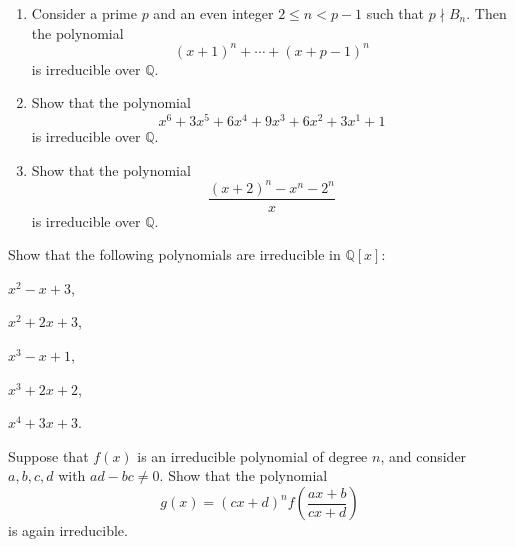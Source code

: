 \begin{example}
  \begin{enumerate}
  \item Consider a prime $p$ and an even integer $2\leq n<p-1$ such that $p\nmid B_n$. Then the polynomial
    \begin{equation*}
      (x+1)^n+\cdots+(x+p-1)^n
    \end{equation*}
    is irreducible over $\mathbb{Q}$.
  \item Show that the polynomial
    \begin{equation*}
      x^6+3x^5+6x^4+9x^3+6x^2+3x^1+1
    \end{equation*}
    is irreducible over $\mathbb{Q}$.
  \item Show that the polynomial
    \begin{equation*}
      \frac{(x+2)^n-x^n-2^n}{x}
    \end{equation*}
    is irreducible over $\mathbb{Q}$.
  \end{enumerate}
\end{example}

\exercises

\begin{starter}
  \exercise Show that the following polynomials are irreducible in $\mathbb{Q}[x]$:
  \begin{subexenum}
  \item $x^2-x+3$,
  \item $x^2+2x+3$,
  \item $x^3-x+1$,
  \item $x^3+2x+2$,
  \item $x^4+3x+3$.
  \end{subexenum}
\end{starter}

\begin{routine}
  \exercise Suppose that $f(x)$ is an irreducible polynomial of degree $n$, and consider $a,b,c,d$ with $ad-bc\neq 0$. Show that the polynomial
  \begin{equation*}
    g(x)=(cx+d)^nf\left(\frac{ax+b}{cx+d}\right)
  \end{equation*}
  is again irreducible.
\end{routine}

